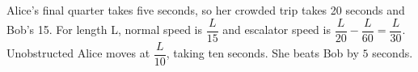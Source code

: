 Alice's final quarter takes five seconds, so her crowded trip takes 20 seconds and Bob's 15. For length L, normal speed is $\dfrac{L}{15}$ and escalator speed is $\dfrac{L}{20}-\dfrac{L}{60}=\dfrac{L}{30}$. Unobstructed Alice moves at $\dfrac{L}{10}$, taking ten seconds. She beats Bob by $\boxed5$ seconds.

